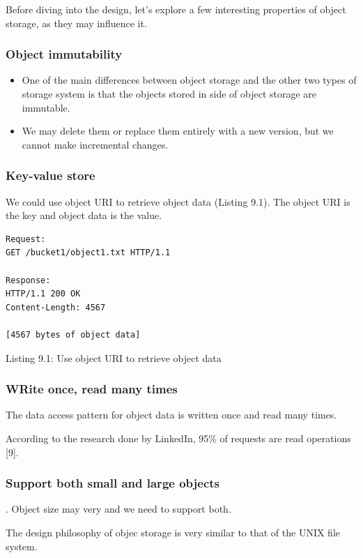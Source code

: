 \documentclass{report}
\theoremstyle{definition}
\let\oldsubsubsection\subsubsection
\renewcommand{\subsubsection}{\oldsubsubsection*}
\begin{document}
Before diving into the design, let's explore a few interesting properties of object storage, as they may influence it.

\subsubsection{Object immutability}

\begin{itemize}
\item
One of the main differences between object storage and the other two types of storage system is that the objects stored in side of object storage are immutable.
\item
We may delete them or replace them entirely  with a new version, but we cannot make incremental changes.
\end{itemize}

\subsubsection{Key-value store}

We could use object URI to retrieve object data (Listing 9.1). The object URI is the key and object data is the value.

\begin{lstlisting}
Request:
GET /bucket1/object1.txt HTTP/1.1

Response:
HTTP/1.1 200 OK
Content-Length: 4567

[4567 bytes of object data]
\end{lstlisting}

Listing 9.1: Use object URI to retrieve object data

\subsubsection{WRite once, read many times}

The data access pattern for object data is written once and read many times.

According to the research done by LinkedIn, 95\% of requests are read operations [9].

\subsubsection{Support both small and large objects}. Object size may very and we need to support both.

The design philosophy of objec storage is very similar to that of the UNIX file system.
\end{document}
